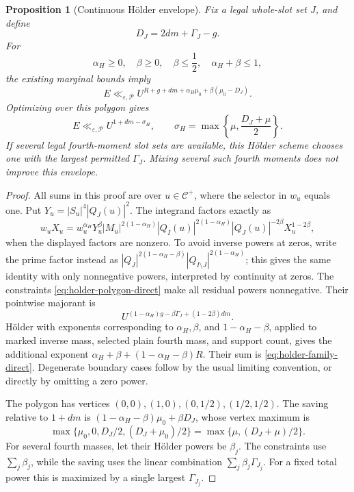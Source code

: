 \documentclass[11pt]{article}
\newtheorem{proposition}[theorem]{Proposition}
\theoremstyle{definition}
\newcommand{\eps}{\varepsilon}
\newcommand{\Cplus}{\mathcal C^+}
\newcommand{\lls}{\ll_{\eps,\mathcal P}}
\begin{document}
\begin{proposition}[Continuous Hölder envelope]
\label{prop:holder-envelope-direct}
Fix a legal whole-slot set \(J\), and define
\begin{equation}
 D_J=2dm+\Gamma_J-g.
 \label{eq:DJ-direct}
\end{equation}
For
\begin{equation}
 \alpha_H\ge0,\quad\beta\ge0,\quad
 \beta\le\frac12,\quad \alpha_H+\beta\le1,
 \label{eq:holder-polygon-direct}
\end{equation}
the existing marginal bounds imply
\begin{equation}
 E\lls U^{R+g+dm+\alpha_H\mu_0+\beta(\mu_0-D_J)}.
 \label{eq:holder-family-direct}
\end{equation}
Optimizing over this polygon gives
\begin{equation}
 E\lls U^{1+dm-\sigma_H},\qquad
 \sigma_H=\max\left\{\mu,\frac{D_J+\mu}{2}\right\}.
 \label{eq:holder-optimum-direct}
\end{equation}
If several legal fourth-moment slot sets are available, this Hölder
scheme chooses one with the largest permitted \(\Gamma_J\).  Mixing
several such fourth moments does not improve this envelope.
\end{proposition}
\begin{proof}
All sums in this proof are over \(u\in\Cplus\), where the selector
in \(w_u\) equals one.  Put \(Y_u=|S_u|^4|Q_J(u)|^2\).
The integrand factors exactly as
\[
 w_uX_u
 =w_u^{\alpha_H} Y_u^\beta
   |M_u|^{2(1-\alpha_H)}
   |Q_I(u)|^{2(1-\alpha_H)}|Q_J(u)|^{-2\beta}
   X_u^{1-2\beta},
\]
when the displayed factors are nonzero.  To avoid inverse powers at
zeros, write the prime factor instead as
\(|Q_J|^{2(1-\alpha_H-\beta)}
 |Q_{I\setminus J}|^{2(1-\alpha_H)}\); this gives the same identity
with only nonnegative powers, interpreted by continuity at zeros.
The constraints \eqref{eq:holder-polygon-direct} make all residual
powers nonnegative.  Their pointwise majorant is
\[
 U^{(1-\alpha_H)g-\beta\Gamma_J+(1-2\beta)dm}.
\]
Hölder with exponents corresponding to \(\alpha_H,\beta\), and
\(1-\alpha_H-\beta\), applied to marked inverse mass, selected plain
fourth mass, and support count, gives the additional exponent
\(\alpha_H+\beta+(1-\alpha_H-\beta)R\).  Their sum is
\eqref{eq:holder-family-direct}.  Degenerate boundary cases follow by
the usual limiting convention, or directly by omitting a zero power.

The polygon has vertices
\((0,0),(1,0),(0,1/2),(1/2,1/2)\).  The saving relative to
\(1+dm\) is
\((1-\alpha_H-\beta)\mu_0+\beta D_J\), whose vertex maximum is
\[
 \max\{\mu_0,0,D_J/2,(D_J+\mu_0)/2\}
       =\max\{\mu,(D_J+\mu)/2\}.
\]
For several fourth masses, let their Hölder powers be \(\beta_j\).
The constraints use \(\sum_j\beta_j\), while the saving uses the
linear combination \(\sum_j\beta_j\Gamma_{J_j}\).  For a fixed
total power this is maximized by a single largest \(\Gamma_{J_j}\).
\end{proof}
\end{document}
